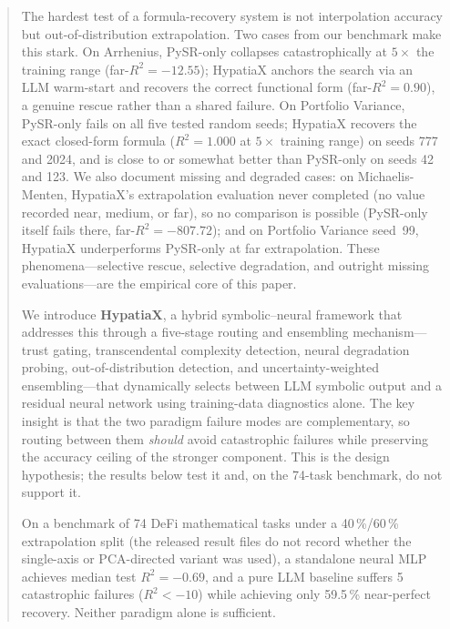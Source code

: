 \documentclass[twoside,11pt]{article}
\newcommand{\Rsq}{R^{2}}
\begin{document}
\begin{abstract}
The hardest test of a formula-recovery system is not interpolation accuracy but
out-of-distribution extrapolation.  Two cases from our benchmark make this stark.
On Arrhenius, PySR-only collapses catastrophically at $5\times$ the
training range (far-$\Rsq = -12.55$); HypatiaX anchors the search via an
LLM warm-start and recovers the correct functional form (far-$\Rsq = 0.90$),
a genuine rescue rather than a shared failure. On Portfolio
Variance, PySR-only fails on all five tested random seeds; HypatiaX recovers
the exact closed-form formula ($\Rsq=1.000$ at $5\times$ training range) on
seeds 777 and 2024, and is close to or somewhat better than PySR-only on
seeds 42 and 123. We also document missing and degraded cases:
on Michaelis-Menten, HypatiaX's extrapolation evaluation never
completed (no value recorded near, medium, or far), so no comparison is possible
(PySR-only itself fails there, far-$\Rsq = -807.72$); and on Portfolio Variance seed~99, HypatiaX
underperforms PySR-only at far extrapolation. These phenomena---selective
rescue, selective degradation, and outright missing evaluations---are the
empirical core of this paper.

We introduce \textbf{HypatiaX}, a hybrid symbolic--neural framework that
addresses this through a five-stage routing and ensembling mechanism---trust
gating, transcendental complexity detection, neural degradation probing,
out-of-distribution detection, and uncertainty-weighted ensembling---that
dynamically selects between LLM symbolic output and a residual neural network
using training-data diagnostics alone.  The key insight is that the two paradigm
failure modes are complementary, so routing between them \emph{should} avoid catastrophic
failures while preserving the accuracy ceiling of the stronger component. This is the
design hypothesis; the results below test it and, on the 74-task benchmark, do not support it.

On a benchmark of 74 DeFi mathematical tasks under a 40\,\%/60\,\% extrapolation split (the released result files do not record whether the single-axis or PCA-directed variant was used), a standalone neural MLP achieves
median test $\Rsq = -0.69$, and a pure LLM baseline suffers 5 catastrophic
failures ($\Rsq < -10$) while achieving only 59.5\,\% near-perfect recovery.
Neither paradigm alone is sufficient.


\end{abstract}
\end{document}
